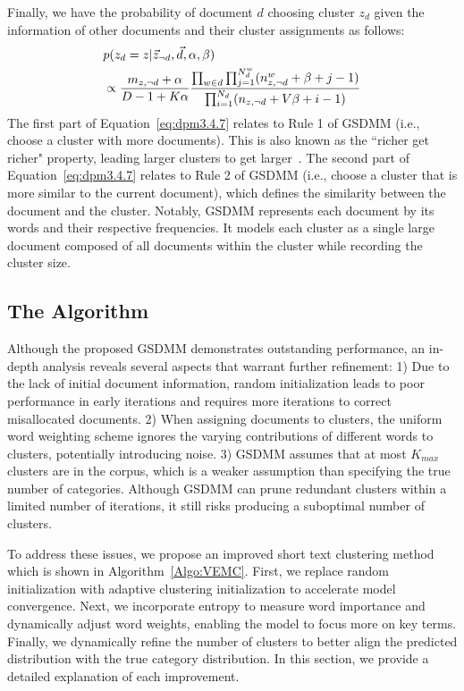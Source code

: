 Finally, we have the probability of document $d$ choosing cluster $z_d$ given the information of other documents and their cluster assignments as follows:
\begin{align}
& \notag
p(z_d=z | \vec{z}_{\neg{d}}, \vec{d}, \alpha, \beta)\\
&
\label{eq:dpm3.4.7}
\propto \frac{m_{z,\neg{d}} + \alpha}{D-1 + K\alpha}
        \frac{\prod_{w \in d} \prod_{j=1}^{N_d^w} (n_{z,\neg{d}}^w + \beta + j - 1)}
           {\prod_{i=1}^{N_d} (n_{z,\neg{d}} + V\beta + i - 1)}
\end{align}
The first part of Equation~\eqref{eq:dpm3.4.7} relates to Rule 1 of GSDMM (i.e., choose a cluster with more documents). This is also known as the ``richer get richer" property, leading larger clusters to get larger~\cite{teh2010dirichlet}. The second part of Equation~\eqref{eq:dpm3.4.7} relates to Rule 2 of GSDMM (i.e., choose a cluster that is more similar to the current document), which defines the similarity between the document and the cluster. Notably, GSDMM represents each document by its words and their respective frequencies. It models each cluster as a single large document composed of all documents within the cluster while recording the cluster size.

\subsection{The \sysname{} Algorithm} \label{VEMC}
Although the proposed GSDMM demonstrates outstanding performance, an in-depth analysis reveals several aspects that warrant further refinement: 1) Due to the lack of initial document information, random initialization leads to poor performance in early iterations and requires more iterations to correct misallocated documents. 2) When assigning documents to clusters, the uniform word weighting scheme ignores the varying contributions of different words to clusters, potentially introducing noise. 3) GSDMM assumes that at most $K_{max}$ clusters are in the corpus, which is a weaker assumption than specifying the true number of categories. Although GSDMM can prune redundant clusters within a limited number of iterations, it still risks producing a suboptimal number of clusters.

To address these issues, we propose an improved short text clustering method \sysname{} which is shown in Algorithm~\ref{Algo:VEMC}. First, we replace random initialization with adaptive clustering initialization to accelerate model convergence. Next, we incorporate entropy to measure word importance and dynamically adjust word weights, enabling the model to focus more on key terms. Finally, we dynamically refine the number of clusters to better align the predicted distribution with the true category distribution. In this section, we provide a detailed explanation of each improvement.

